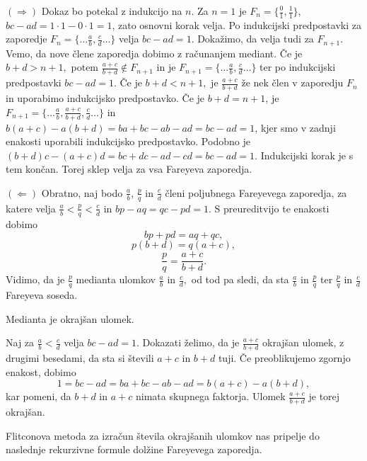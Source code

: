 \documentclass[mat1]{fmfdelo}
\begin{document}
\begin{dokaz}
$(\Rightarrow)$ Dokaz bo potekal z indukcijo na $n$.
Za $n=1$ je $F_n = \{\frac{0}{1}, \frac{1}{1}\}$, $bc - ad = 1\cdot1 - 0\cdot1 = 1$, zato osnovni korak velja.
Po indukcijski predpostavki za zaporedje \( F_n = \{\ldots \frac{a}{b}, \frac{c}{d} \ldots \} \) velja $bc - ad = 1$. Dokažimo, da velja tudi za $F_{n+1}$. Vemo, da nove člene zaporedja dobimo z računanjem mediant. Če je $b+d > n+1,$ potem $\frac{a+c}{b+d} \notin F_{n+1}$ in je \( F_{n+1} = \{\ldots \frac{a}{b}, \frac{c}{d} \ldots \} \) ter po indukcijski predpostavki $bc - ad = 1$. 
Če je $b+d < n+1,$ je $\frac{a+c}{b+d}$ že nek člen v zaporedju $F_n$ in uporabimo indukcijsko predpostavko. 
Če je $b+d = n+1$, je \( F_{n+1} = \{\ldots \frac{a}{b}, \frac{a+c}{b+d}, \frac{c}{d} \ldots \} \) in $b(a + c) - a(b + d) = ba + bc - ab - ad = bc - ad = 1$, kjer smo v zadnji enakosti uporabili indukcijsko predpostavko. Podobno je $(b + d)c - (a + c)d = bc + dc - ad - cd = bc - ad = 1$. Indukcijski korak je s tem končan. Torej sklep velja za vsa Fareyeva zaporedja.

$(\Leftarrow)$ Obratno, naj bodo $\frac{a}{b}$, $\frac{p}{q}$ in $\frac{c}{d}$ členi poljubnega Fareyevega zaporedja, za katere velja $\frac{a}{b} <\frac{p}{q} < \frac{c}{d}$ in $bp - aq = qc - pd = 1$. S preureditvijo te enakosti dobimo
\[ bp + pd = aq + qc, \]
\[ p(b + d) = q(a + c), \]
\[ \frac{p}{q} = \frac{a+c}{b+d}. \]
Vidimo, da je $\frac{p}{q}$ medianta ulomkov $\frac{a}{b}$ in $\frac{c}{d},$ od tod pa sledi, da sta $\frac{a}{b}$ in $\frac{p}{q}$ ter $\frac{p}{q}$ in $\frac{c}{d}$ Fareyeva soseda.
\end{dokaz}

\begin{lema}
\label{lema:MediantaOkrUlom}
Medianta je okrajšan ulomek.
\end{lema}

\begin{dokaz}
Naj za $\frac{a}{b} < \frac{c}{d}$ velja $bc - ad = 1$. Dokazati želimo, da je $\frac{a+c}{b+d}$ okrajšan ulomek, z drugimi besedami, da sta si števili $a+c$ in $b+d$ tuji. Če preoblikujemo zgornjo enakost, dobimo 
\[ 1 = bc - ad = ba + bc - ab - ad = b(a + c) - a(b + d), \]
kar pomeni, da $b+d$ in $a+c$ nimata skupnega faktorja. Ulomek $\frac{a+c}{b+d}$ je torej okrajšan.
\end{dokaz}

%
Flitconova metoda za izračun števila okrajšanih ulomkov nas pripelje do naslednje rekurzivne formule dolžine Fareyevega zaporedja.
\end{document}
